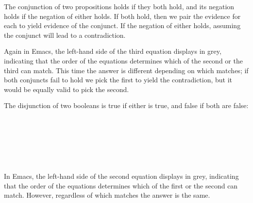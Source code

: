 The conjunction of two propositions holds if they both hold, and its
negation holds if the negation of either holds. If both hold, then we
pair the evidence for each to yield evidence of the conjunct. If the
negation of either holds, assuming the conjunct will lead to a
contradiction.

Again in Emacs, the left-hand side of the third equation displays in
grey, indicating that the order of the equations determines which of the
second or the third can match. This time the answer is different
depending on which matches; if both conjuncts fail to hold we pick the
first to yield the contradiction, but it would be equally valid to pick
the second.

The disjunction of two booleans is true if either is true, and false if
both are false:

\begin{fence}
\begin{code}%
\>[0]\AgdaSpace{}%
\AgdaSpace{}%
\<%
\\
%
\\[\AgdaEmptyExtraSkip]%
\>[0]\AgdaSpace{}%
\AgdaSymbol{:}\AgdaSpace{}%
\AgdaSpace{}%
\AgdaSpace{}%
\AgdaSpace{}%
\AgdaSpace{}%
\<%
\\
\>[0]%
\>[6]\AgdaSpace{}%
\AgdaSymbol{\AgdaUnderscore{}}%
\>[15]\AgdaSymbol{=}\AgdaSpace{}%
\<%
\\
\>[0]\AgdaCatchallClause{\AgdaSymbol{\AgdaUnderscore{}}}%
\>[6]\AgdaSpace{}%
%
\>[15]\AgdaSymbol{=}\AgdaSpace{}%
\<%
\\
\>[0]\AgdaSpace{}%
\AgdaSpace{}%
%
\>[15]\AgdaSymbol{=}\AgdaSpace{}%
\<%
\end{code}
\end{fence}

In Emacs, the left-hand side of the second equation displays in grey,
indicating that the order of the equations determines which of the first
or the second can match. However, regardless of which matches the answer
is the same.

